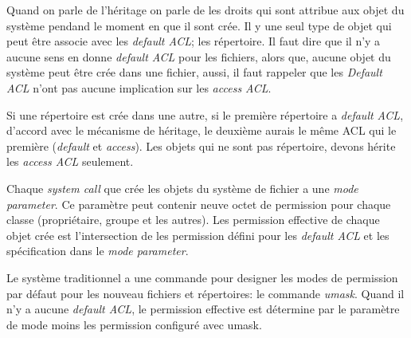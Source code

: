 Quand on parle de l'héritage on parle de les droits qui sont attribue aux objet du système pendand le moment en que il sont crée. Il y une seul type de objet qui peut être associe avec les \emph{default ACL}; les répertoire. Il faut dire que il n'y a aucune sens en donne \emph{default ACL } pour les fichiers, alors que, aucune objet du système peut être crée dans une fichier, aussi, il faut rappeler que les \emph{Default ACL} n'ont pas aucune implication sur les \emph{access ACL}.

Si une répertoire est crée dans une autre, si le première répertoire a \emph{default ACL}, d'accord avec le mécanisme de héritage,  le deuxième aurais le même ACL qui le première (\emph{default} et \emph{access}). Les objets qui ne sont pas répertoire, devons hérite les \emph{access ACL} seulement. 

Chaque \emph{system call} que crée les objets du système de fichier a une \emph{mode parameter}. Ce paramètre peut contenir neuve octet de permission pour chaque classe (propriétaire, groupe et les autres). Les permission effective de chaque objet crée est l'intersection de les permission défini pour les \emph{default ACL} et les spécification dans le \emph{mode parameter}.

Le système traditionnel a une commande pour designer les modes de permission par défaut pour les nouveau fichiers et répertoires: le commande \emph{umask}. Quand il n'y a aucune \emph{default ACL}, le permission effective est détermine par le paramètre de mode moins les permission configuré avec umask. 

